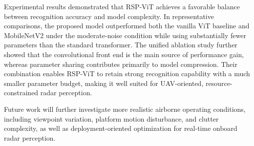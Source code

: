 \documentclass{svproc}
\begin{document}
Experimental results demonstrated that RSP-ViT achieves a favorable balance between recognition accuracy and model complexity. In representative comparisons, the proposed model outperformed both the vanilla ViT baseline and MobileNetV2 under the moderate-noise condition while using substantially fewer parameters than the standard transformer. The unified ablation study further showed that the convolutional front end is the main source of performance gain, whereas parameter sharing contributes primarily to model compression. Their combination enables RSP-ViT to retain strong recognition capability with a much smaller parameter budget, making it well suited for UAV-oriented, resource-constrained radar perception.

Future work will further investigate more realistic airborne operating conditions, including viewpoint variation, platform motion disturbance, and clutter complexity, as well as deployment-oriented optimization for real-time onboard radar perception.
\end{document}
